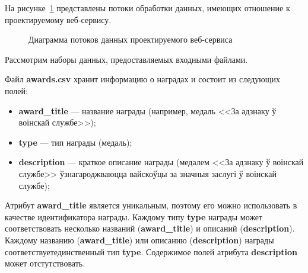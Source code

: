 На рисунке~\ref{fig:activity_diagram} представлены потоки обработки данных,
имеющих отношение к проектируемому веб-сервису.

\begin{figure}[h!]
  \centering
  \small{
    
  }
  \caption{Диаграмма потоков данных проектируемого веб-сервиса}
  \label{fig:activity_diagram}
\end{figure}

Рассмотрим наборы данных, предоставляемых входными файлами.

Файл \textbf{awards.csv} хранит информацию о наградах и состоит из следующих полей:
\begin{itemize}
\item
  \textbf{award\_title} --- название награды
  (например, медаль <<За адзнаку ў воінскай службе>>);
\item
  \textbf{type} --- тип награды
  (медаль);
\item
  \textbf{description} --- краткое описание награды
  (медалем <<За адзнаку ў воінскай службе>>
  ўзнагароджваюцца вайскоўцы за значныя заслугі ў воінскай службе);
\end{itemize}

Атрибут \textbf{award\_title} является уникальным, поэтому его можно использовать
в качестве идентификатора награды.
Каждому типу \textbf{type} награды может соответствовать несколько названий 
(\textbf{award\_title}) и описаний (\textbf{description}).
Каждому названию (\textbf{award\_title}) или описанию (\textbf{description}) награды
соответствуетединственный тип \textbf{type}.
Содержимое полей атрибута \textbf{description} может отстутствовать.

